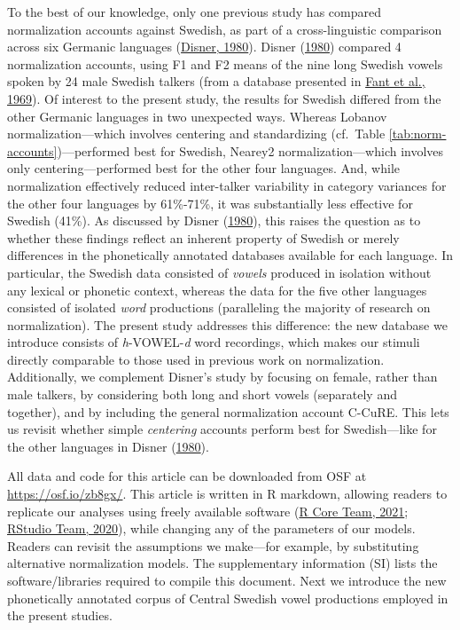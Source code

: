 \documentclass[utf8]{frontiersSCNS}
\begin{document}
To the best of our knowledge, only one previous study has compared normalization accounts against Swedish, as part of a cross-linguistic comparison across six Germanic languages (\protect\hyperlink{ref-disner1980}{Disner, 1980}). Disner (\protect\hyperlink{ref-disner1980}{1980}) compared 4 normalization accounts, using F1 and F2 means of the nine long Swedish vowels spoken by 24 male Swedish talkers (from a database presented in \protect\hyperlink{ref-fant1969}{Fant et al., 1969}). Of interest to the present study, the results for Swedish differed from the other Germanic languages in two unexpected ways. Whereas Lobanov normalization---which involves centering and standardizing (cf.~Table \ref{tab:norm-accounts})---performed best for Swedish, Nearey2 normalization---which involves only centering---performed best for the other four languages. And, while normalization effectively reduced inter-talker variability in category variances for the other four languages by 61\%-71\%, it was substantially less effective for Swedish (41\%). As discussed by Disner (\protect\hyperlink{ref-disner1980}{1980}), this raises the question as to whether these findings reflect an inherent property of Swedish or merely differences in the phonetically annotated databases available for each language. In particular, the Swedish data consisted of \emph{vowels} produced in isolation without any lexical or phonetic context, whereas the data for the five other languages consisted of isolated \emph{word} productions (paralleling the majority of research on normalization). The present study addresses this difference: the new database we introduce consists of \emph{h}-VOWEL-\emph{d} word recordings, which makes our stimuli directly comparable to those used in previous work on normalization. Additionally, we complement Disner's study by focusing on female, rather than male talkers, by considering both long and short vowels (separately and together), and by including the general normalization account C-CuRE. This lets us revisit whether simple \emph{centering} accounts perform best for Swedish---like for the other languages in Disner (\protect\hyperlink{ref-disner1980}{1980}).

All data and code for this article can be downloaded from OSF at \url{https://osf.io/zb8gx/}. This article is written in R markdown, allowing readers to replicate our analyses using freely available software (\protect\hyperlink{ref-R}{R Core Team, 2021}; \protect\hyperlink{ref-RStudio}{RStudio Team, 2020}), while changing any of the parameters of our models. Readers can revisit the assumptions we make---for example, by substituting alternative normalization models. The supplementary information (SI) lists the software/libraries required to compile this document. Next we introduce the new phonetically annotated corpus of Central Swedish vowel productions employed in the present studies.
\end{document}
